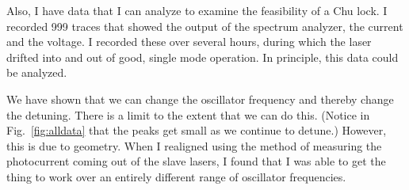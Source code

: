 Also, I have data that I can analyze to examine the feasibility of a Chu lock. I recorded 999 traces that showed the output of the spectrum analyzer, the current and the voltage. I recorded these over several hours, during which the laser drifted into and out of good, single mode operation. In principle, this data could be analyzed. 

We have shown that we can change the oscillator frequency and thereby change the detuning. There is a limit to the extent that we can do this. (Notice in Fig.\ \ref{fig:alldata} that the peaks get small as we continue to detune.) However, this is due to geometry. When I realigned using the method of measuring the photocurrent coming out of the slave lasers, I found that I was able to get the thing to work over an entirely different range of oscillator frequencies. 

